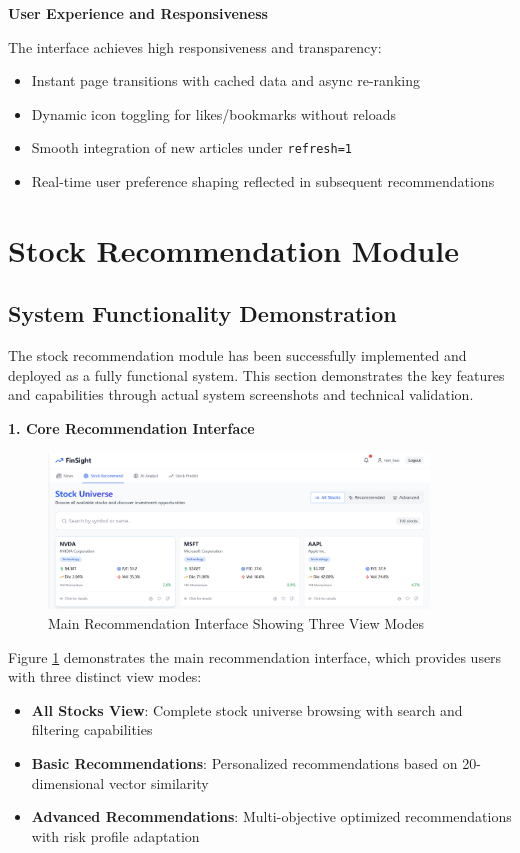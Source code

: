 \textbf{User Experience and Responsiveness}

The interface achieves high responsiveness and transparency:
\begin{itemize}
\item Instant page transitions with cached data and async re-ranking
\item Dynamic icon toggling for likes/bookmarks without reloads
\item Smooth integration of new articles under \texttt{refresh=1}
\item Real-time user preference shaping reflected in subsequent recommendations
\end{itemize}


\section{Stock Recommendation Module}

\subsection{System Functionality Demonstration}

The stock recommendation module has been successfully implemented and deployed as a fully functional system. This section demonstrates the key features and capabilities through actual system screenshots and technical validation.

\textbf{1. Core Recommendation Interface}

\begin{figure}[h]
\centering
\includegraphics[width=0.9\textwidth]{images/stock_recommend/main_page.png}
\caption{Main Recommendation Interface Showing Three View Modes}
\label{fig:main_interface}
\end{figure}

Figure \ref{fig:main_interface} demonstrates the main recommendation interface, which provides users with three distinct view modes:
\begin{itemize}
\item \textbf{All Stocks View}: Complete stock universe browsing with search and filtering capabilities
\item \textbf{Basic Recommendations}: Personalized recommendations based on 20-dimensional vector similarity
\item \textbf{Advanced Recommendations}: Multi-objective optimized recommendations with risk profile adaptation
\end{itemize}

